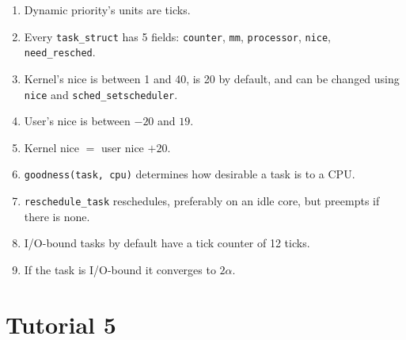 \documentclass[12pt,a4paper]{article}
\begin{document}
\begin{enumerate}
  \item Dynamic priority's units are ticks.
  \item Every \texttt{task\_struct} has 5 fields: \texttt{counter}, \texttt{mm}, \texttt{processor}, \texttt{nice}, \texttt{need\_resched}.
  \item Kernel's nice is between 1 and 40, is 20 by default, and can be changed using \texttt{nice} and \texttt{sched\_setscheduler}.
  \item User's nice is between $-20$ and $19$.
  \item Kernel nice $=$ user nice $+ 20$.
  \item \texttt{goodness(task, cpu)} determines how desirable a task is to a CPU.
  \item \texttt{reschedule\_task} reschedules, preferably on an idle core, but preempts if there is none.
  \item I/O-bound tasks by default have a tick counter of 12 ticks.
  \item If the task is I/O-bound it converges to $2\alpha$.
\end{enumerate}

\section{Tutorial 5}
\end{document}
